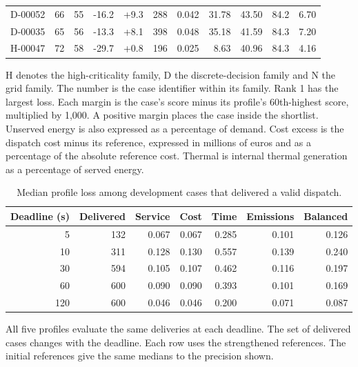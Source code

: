 \documentclass[11pt,a4paper]{article}
\begin{document}
\begin{table}[H]
\begin{tabular}{@{}lrrrrrrrrrr@{}}
D-00052 & 66 & 55 & -16.2 & +9.3 & 288 & 0.042 & 31.78 & 43.50 & 84.2 & 6.70\\
D-00035 & 65 & 56 & -13.3 & +8.1 & 398 & 0.048 & 35.18 & 41.59 & 84.3 & 7.20\\
H-00047 & 72 & 58 & -29.7 & +0.8 & 196 & 0.025 & 8.63 & 40.96 & 84.3 & 4.16\\
\bottomrule\end{tabular}
\par\smallskip\begin{minipage}{\linewidth}\footnotesize
H denotes the high-criticality family, D the discrete-decision family and N the grid family. The number is the case identifier within its family. Rank 1 has the largest loss. Each margin is the case's score minus its profile's 60th-highest score, multiplied by 1,000. A positive margin places the case inside the shortlist. Unserved energy is also expressed as a percentage of demand. Cost excess is the dispatch cost minus its reference, expressed in millions of euros and as a percentage of the absolute reference cost. Thermal is internal thermal generation as a percentage of served energy.
\end{minipage}\end{table}

\begin{table}[H]\centering\small
\caption{Median profile loss among development cases that delivered a valid dispatch.}\label{tab:conditional_loss}
\begin{tabular}{@{}rrrrrrr@{}}\toprule
Deadline (s) & Delivered & Service & Cost & Time & Emissions & Balanced\\\midrule
5 & 132 & 0.067 & 0.067 & 0.285 & 0.101 & 0.126\\
10 & 311 & 0.128 & 0.130 & 0.557 & 0.139 & 0.240\\
30 & 594 & 0.105 & 0.107 & 0.462 & 0.116 & 0.197\\
60 & 600 & 0.090 & 0.090 & 0.393 & 0.101 & 0.169\\
120 & 600 & 0.046 & 0.046 & 0.200 & 0.071 & 0.087\\
\bottomrule\end{tabular}
\par\smallskip\begin{minipage}{\linewidth}\footnotesize
All five profiles evaluate the same deliveries at each deadline. The set of delivered cases changes with the deadline. Each row uses the strengthened references. The initial references give the same medians to the precision shown.
\end{minipage}\end{table}
\end{document}
